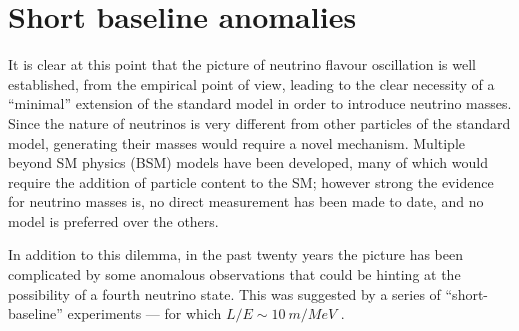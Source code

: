 \section{Short baseline anomalies}\label{sec:anomalies}

It is clear at this point that the picture of neutrino flavour oscillation is well established, from the empirical point of view, leading to the clear necessity of a ``minimal'' extension of the standard model in order to introduce neutrino masses. Since the nature of neutrinos is very different from other particles of the standard model, generating their masses would require a novel mechanism. Multiple beyond SM physics (BSM) models have been developed, many of which would require the addition of particle content to the SM; however strong the evidence for neutrino masses is, no direct measurement has been made to date, and no model is preferred over the others. 

In addition to this dilemma, in the past twenty years the picture has been complicated by some anomalous observations that could be hinting at the possibility of a fourth neutrino state. This was suggested by a series of ``short-baseline'' experiments --- for which $L/E \sim \SI{10}{m}/\si{MeV}$ \cite{aceroWhitePaperLight2024}. 

